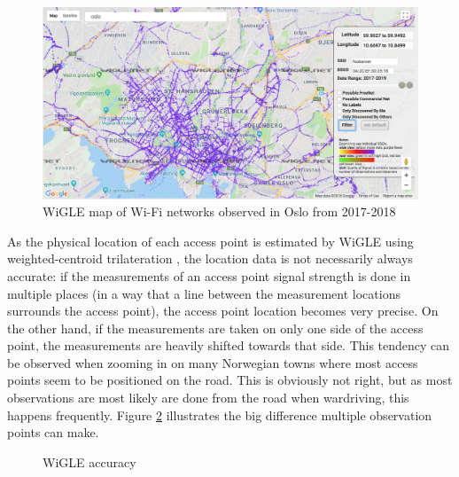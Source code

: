 \begin{figure}[h]
	\center
	\includegraphics[scale=0.35]{Images/wigle.png}
	\caption{WiGLE map of Wi-Fi networks observed in Oslo from 2017-2018}
	\label{fig:wigfig}
\end{figure}


	As the physical location of each access point is estimated by WiGLE using weighted-centroid trilateration \cite{Sharma}, the location data is not necessarily always accurate:
	if the measurements of an access point signal strength is done in multiple places (in a way that a line between the measurement locations surrounds the access point),
	the access point location becomes very precise. On the other hand, if the measurements are taken on only one side of the access point,
	the measurements are heavily shifted towards that side. This tendency can be observed
	when zooming in on many Norwegian towns where most access points seem to be positioned on the road. This is obviously not right, but as most observations
	are most likely are done from the road when wardriving, this happens frequently. Figure \ref{fig:wiglediff} illustrates the big difference multiple observation points can make.

\begin{figure}
	\centering
		\qquad
		\caption{WiGLE accuracy}%
		\label{fig:wiglediff}%
\end{figure}


